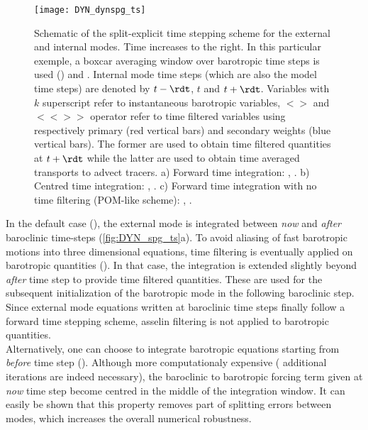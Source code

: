 \documentclass[../main/NEMO_manual]{subfiles}
\begin{document}
\begin{figure}[!t]
  \centering
  \texttt{[image: DYN\_dynspg\_ts]}
  \caption[Split-explicit time stepping scheme for the external and internal modes]{
    Schematic of the split-explicit time stepping scheme for the external and internal modes.
    Time increases to the right.
    In this particular exemple,
    a boxcar averaging window over  barotropic time steps is used
    () and .
    Internal mode time steps (which are also the model time steps) are denoted by
    $t-\rdt$, $t$ and $t+\rdt$.
    Variables with $k$ superscript refer to instantaneous barotropic variables,
    $< >$ and $<< >>$ operator refer to time filtered variables using respectively primary
    (red vertical bars) and secondary weights (blue vertical bars).
    The former are used to obtain time filtered quantities at $t+\rdt$ while
    the latter are used to obtain time averaged transports to advect tracers.
    a) Forward time integration:
    \protect{},  \protect{}.
    b) Centred time integration:
    \protect{}, \protect{}.
    c) Forward time integration with no time filtering (POM-like scheme):
    \protect{},  \protect{}.}
  \label{fig:DYN_spg_ts}
\end{figure}

In the default case (),
the external mode is integrated between \textit{now} and \textit{after} baroclinic time-steps
(\autoref{fig:DYN_spg_ts}a).
To avoid aliasing of fast barotropic motions into three dimensional equations,
time filtering is eventually applied on barotropic quantities ().
In that case, the integration is extended slightly beyond \textit{after} time step to
provide time filtered quantities.
These are used for the subsequent initialization of the barotropic mode in the following baroclinic step.
Since external mode equations written at baroclinic time steps finally follow a forward time stepping scheme,
asselin filtering is not applied to barotropic quantities.\\
Alternatively, one can choose to integrate barotropic equations starting from \textit{before} time step
().
Although more computationaly expensive (  additional iterations are indeed necessary),
the baroclinic to barotropic forcing term given at \textit{now} time step become centred in
the middle of the integration window.
It can easily be shown that this property removes part of splitting errors between modes,
which increases the overall numerical robustness.
\end{document}
